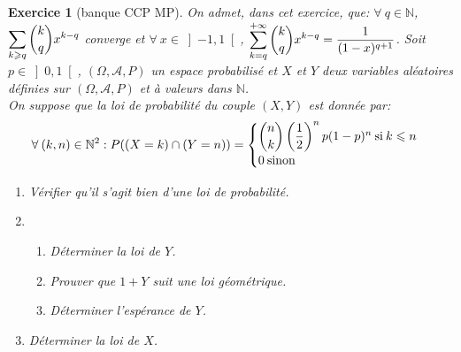 \documentclass[12pt,a4paper]{article}
\newtheorem{Exo}{Exercice}
\begin{document}
\begin{Exo}[banque CCP MP]
	On admet, dans cet exercice, que:
	$\forall\:q\in \mathbb{N}$, $\displaystyle\sum\limits_{k\geqslant q}^{}\dbinom {k}{q}x^{k-q}$ converge et  $\forall \:x\in \left] -1,1\right[$,   $\displaystyle\sum\limits_{k=q}^{+\infty}\dbinom{k}{q}x^{k-q}=\dfrac{1}{(1-x)^{q+1}}$.
	Soit $p\in \left] 0,1\right[ $, $(\Omega,\mathcal{A},P)$ un espace probabilisé et $X$ et $Y$ deux variables aléatoires définies sur  $(\Omega,\mathcal{A},P)$ et à valeurs dans $\mathbb{N}$.\\
	On suppose que la loi de probabilité du  couple $(X,Y)$ est donnée par:\\
	\medskip
	$$\forall\:(k,n)\in\mathbb{N}^2:P((X=k)\cap (Y=n))=
	\begin{cases}
\dbinom{n}{k}\left( \dfrac{1}{2}\right)^np(1-p)^n\:\text{si}\:k\leqslant n\\
	0\:\text{sinon} 
	\end{cases}$$
	\begin{enumerate}
		\item
		Vérifier qu'il s'agit bien d'une loi de probabilité.
		\item
		\begin{enumerate}
			\item
			Déterminer la loi de $Y$.
			\item
			Prouver que $1+Y$ suit une loi géométrique.
			\item
			Déterminer l'espérance de $Y$.
		\end{enumerate}
		\item
		Déterminer la loi de $X$.
		
		
	\end{enumerate}
\end{Exo}
\end{document}

